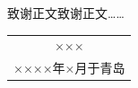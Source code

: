 \begin{thanks}
致谢正文致谢正文……


\begin{flushright}
  \begin{tabular}{c}
    ××× \\
    ××××年×月于青岛
  \end{tabular}
\end{flushright}

\end{thanks}
